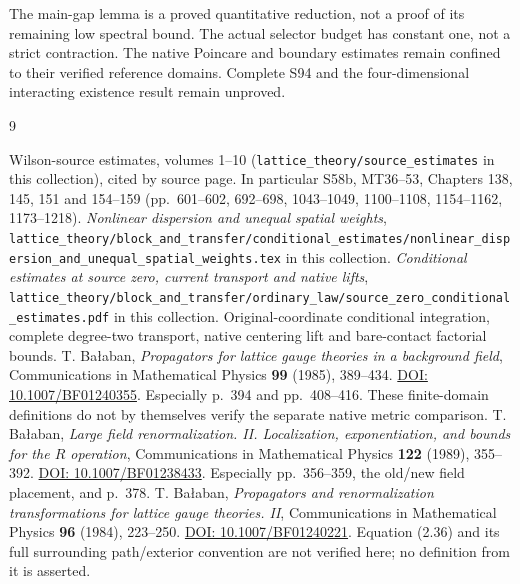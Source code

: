 \documentclass[11pt,letterpaper]{article}
\theoremstyle{remark}\newtheorem{remark}[theorem]{Remark}
\begin{document}
The main-gap lemma is a proved quantitative reduction, not a proof of its remaining low spectral bound. The actual selector budget has constant one, not a strict contraction. The native Poincare and boundary estimates remain confined to their verified reference domains. Complete S94 and the four-dimensional interacting existence result remain unproved.

\clearpage
\begin{thebibliography}{9}\raggedright
{} Wilson-source estimates, volumes 1--10 (\texttt{lattice\_theory/source\_estimates} in this collection), cited by source page. In particular S58b, MT36--53, Chapters 138, 145, 151 and 154--159 (pp.~601--602, 692--698, 1043--1049, 1100--1108, 1154--1162, 1173--1218).
 \emph{Nonlinear dispersion and unequal spatial weights}, \texttt{lattice\_theory/block\_and\_transfer/conditional\_estimates/nonlinear\_dispersion\_and\_unequal\_spatial\_weights.tex} in this collection.
 \emph{Conditional estimates at source zero, current transport and native lifts}, \texttt{lattice\_theory/block\_and\_transfer/ordinary\_law/source\_zero\_conditional\_estimates.pdf} in this collection. Original-coordinate conditional integration, complete degree-two transport, native centering lift and bare-contact factorial bounds.
 T. Ba{\l}aban, \emph{Propagators for lattice gauge theories in a background field}, Communications in Mathematical Physics \textbf{99} (1985), 389--434. \href{https://doi.org/10.1007/BF01240355}{DOI: 10.1007/BF01240355}. Especially p.~394 and pp.~408--416. These finite-domain definitions do not by themselves verify the separate native metric comparison.
 T. Ba{\l}aban, \emph{Large field renormalization. II. Localization, exponentiation, and bounds for the $R$ operation}, Communications in Mathematical Physics \textbf{122} (1989), 355--392. \href{https://doi.org/10.1007/BF01238433}{DOI: 10.1007/BF01238433}. Especially pp.~356--359, the old/new field placement, and p.~378.
 T. Ba{\l}aban, \emph{Propagators and renormalization transformations for lattice gauge theories. II}, Communications in Mathematical Physics \textbf{96} (1984), 223--250. \href{https://doi.org/10.1007/BF01240221}{DOI: 10.1007/BF01240221}. Equation (2.36) and its full surrounding path/exterior convention are not verified here; no definition from it is asserted.
\end{thebibliography}
\end{document}
